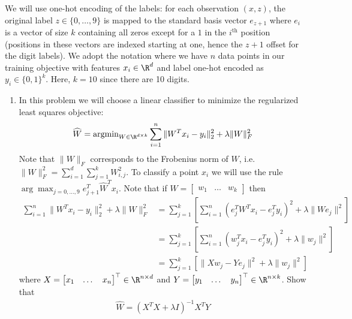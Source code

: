 \documentclass{article}
\begin{document}
\begin{aprob}
    We will use one-hot encoding of the labels: for each observation $(x,z)$, the original label $z \in \{0, \ldots, 9\}$ is mapped to the standard basis vector $e_{z+1}$ where $e_i$ is a vector of size $k$ containing all zeros except for a $1$ in the $i^{\textrm{th}}$ position (positions in these vectors are indexed starting at one, hence the $z+1$ offset for the digit labels). We adopt the notation where we have $n$ data points in our training objective with features $x_i \in \R^d$ and label one-hot encoded as $y_i \in \{0,1\}^k$. Here, $k=10$ since there are 10 digits.
    
    \begin{enumerate}
        \item {} In this problem we will choose a linear classifier to minimize the regularized least squares objective:
        \begin{align*}
            \widehat{W} = \text{argmin}_{W \in \R^{d \times k}} \sum_{i=1}^{n} \| W^Tx_{i} - y_{i} \|^{2}_{2} + \lambda \|W\|_{F}^{2}
        \end{align*}
        Note that $\|W\|_{F}$ corresponds to the Frobenius norm of $W$, i.e. $\|W\|_{F}^{2} = \sum_{i=1}^d \sum_{j=1}^k W_{i,j}^2$. To classify a point $x_i$ we will use the rule $\arg\max_{j=0,\dots,9} e_{j+1}^T \widehat{W}^T x_i$. Note that if $W = \begin{bmatrix} w_1 & \dots & w_k \end{bmatrix}$ then
        \begin{align*}
            \sum_{i=1}^{n} \| W^Tx_{i} - y_{i} \|^{2}_{2} + \lambda \|W\|_{F}^{2} &= \sum_{j=1}^k \left[  \sum_{i=1}^n ( e_j^T W^T x_i - e_j^T y_i)^2 + \lambda \| W e_j \|^2 \right] \\
            &= \sum_{j=1}^k \left[  \sum_{i=1}^n ( w_j^T x_i - e_j^T y_i)^2 + \lambda \| w_j \|^2 \right] \\
            &= \sum_{j=1}^k \left[  \| X w_j - Y e_j\|^2 + \lambda \| w_j \|^2 \right]
        \end{align*}
        where $X = \begin{bmatrix} x_1 & \dots & x_n \end{bmatrix}^\top \in \R^{n \times d}$ and $Y = \begin{bmatrix} y_1 & \dots & y_n \end{bmatrix}^\top \in \R^{n \times k}$. Show that
        \begin{align*}
            \widehat{W} = (X^T X + \lambda I)^{-1} X^T Y
        \end{align*} 


\end{enumerate}
\end{aprob}
\end{document}
